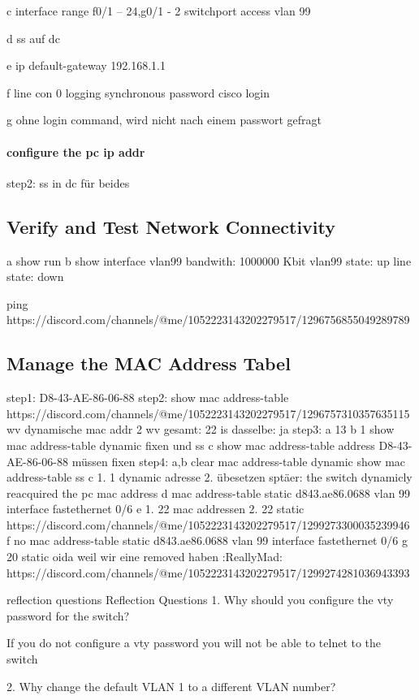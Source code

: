 \documentclass[a4paper]{article}
\begin{document}
c
interface range f0/1 – 24,g0/1 - 2
switchport access vlan 99

d
ss auf dc

e
ip default-gateway 192.168.1.1

f
line con 0 
logging synchronous
password cisco
login

g
ohne login command, wird nicht nach einem passwort gefragt


\paragraph {configure the pc ip addr}
step2:
ss in dc für beides
\subsection{Verify and Test Network Connectivity}
a
show run
b
show interface vlan99
bandwith: 1000000 Kbit
vlan99 state: up
line state: down

ping
https://discord.com/channels/@me/1052223143202279517/1296756855049289789


\subsection{Manage the MAC Address Tabel}

step1: 
D8-43-AE-86-06-88
step2:
show mac address-table
https://discord.com/channels/@me/1052223143202279517/1296757310357635115
wv dynamische mac addr
2
wv gesamt:
22
is dasselbe:
ja
step3:
a
13
b
1
show mac address-table dynamic
fixen und ss
c
show mac address-table address D8-43-AE-86-06-88
müssen fixen
step4:
a,b
clear mac address-table dynamic
show mac address-table
ss
c
1.
1 dynamic adresse
2. übesetzen sptäer: the switch dynamicly reacquired the pc mac address
d
mac address-table static d843.ae86.0688 vlan 99 interface fastethernet 0/6 
e
1.
22 mac addressen 
2. 
22 static
https://discord.com/channels/@me/1052223143202279517/1299273300035239946
f
no mac address-table static d843.ae86.0688 vlan 99 interface fastethernet 0/6
g
20 static oida weil wir eine removed haben :ReallyMad:
https://discord.com/channels/@me/1052223143202279517/1299274281036943393

reflection questions
Reflection Questions
1. Why should you configure the vty password for the switch?

If you do not configure a vty password you will not be able to telnet to the switch

2. Why change the default VLAN 1 to a different VLAN number?
\end{document}
